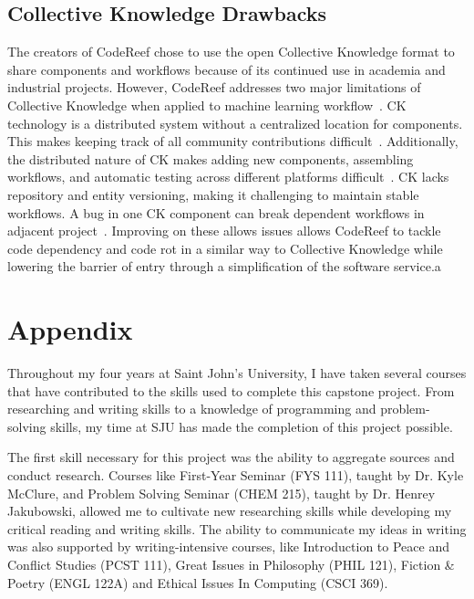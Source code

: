 \documentclass{IEEEtran}
\begin{document}
\subsection{Collective Knowledge Drawbacks}
The creators of CodeReef chose to use the open Collective Knowledge format to share components and workflows because of its continued use in academia and industrial projects. However, CodeReef addresses two major limitations of Collective Knowledge when applied to machine learning workflow~\cite{CROP}.
CK technology is a distributed system without a centralized location for components. This makes keeping track of all community contributions difficult~\cite{CROP}. Additionally, the distributed nature of CK makes adding new components, assembling workflows, and automatic testing across different platforms difficult~\cite{CROP}. 
CK lacks repository and entity versioning, making it challenging to maintain stable workflows. A bug in one CK component can break dependent workflows in adjacent project~\cite{CROP}.
Improving on these allows issues allows CodeReef to tackle code dependency and code rot in a similar way to Collective Knowledge while lowering the barrier of entry through a simplification of the software service.a

\section{Appendix}
Throughout my four years at Saint John's University, I have taken several courses that have contributed to the skills used to complete this capstone project. From researching and writing skills to a knowledge of programming and problem-solving skills, my time at SJU has made the completion of this project possible.

The first skill necessary for this project was the ability to aggregate sources and conduct research. Courses like First-Year Seminar (FYS 111), taught by Dr. Kyle McClure, and Problem Solving Seminar (CHEM 215), taught by Dr. Henrey Jakubowski, allowed me to cultivate new researching skills while developing my critical reading and writing skills. The ability to communicate my ideas in writing was also supported by writing-intensive courses, like Introduction to Peace and Conflict Studies (PCST 111), Great Issues in Philosophy (PHIL 121), Fiction \& Poetry (ENGL 122A) and Ethical Issues In Computing (CSCI 369).
\end{document}
